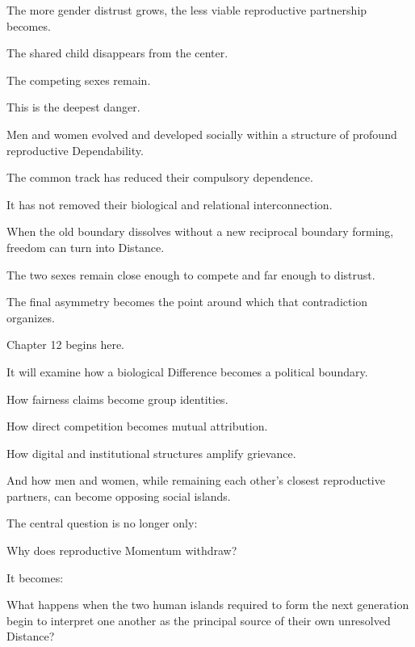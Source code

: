 The more gender distrust grows, the less viable reproductive partnership becomes.

The shared child disappears from the center.

The competing sexes remain.

This is the deepest danger.

Men and women evolved and developed socially within a structure of profound reproductive Dependability.

The common track has reduced their compulsory dependence.

It has not removed their biological and relational interconnection.

When the old boundary dissolves without a new reciprocal boundary forming, freedom can turn into Distance.

The two sexes remain close enough to compete and far enough to distrust.

The final asymmetry becomes the point around which that contradiction organizes.

Chapter 12 begins here.

It will examine how a biological Difference becomes a political boundary.

How fairness claims become group identities.

How direct competition becomes mutual attribution.

How digital and institutional structures amplify grievance.

And how men and women, while remaining each other’s closest reproductive partners, can become opposing social islands.

The central question is no longer only:

Why does reproductive Momentum withdraw?

It becomes:

What happens when the two human islands required to form the next generation begin to interpret one another as the principal source of their own unresolved Distance?

